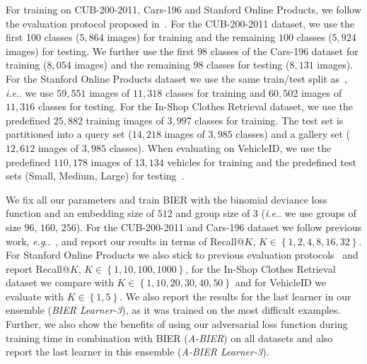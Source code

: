 \documentclass[10pt,journal,compsoc]{IEEEtran}
\makeatletter
\DeclareRobustCommand\onedot{\futurelet\@let@token\@onedot}
\def\@onedot{\ifx\@let@token.\else.\null\fi\xspace}
\def\eg{\emph{e.g}\onedot} \def\Eg{\emph{E.g}\onedot}
\def\ie{\emph{i.e}\onedot} \def\Ie{\emph{I.e}\onedot}
\makeatother
\begin{document}
For training on CUB-200-2011, Cars-196 and Stanford Online Products, we follow the evaluation protocol proposed
in~\cite{oh2016deep}. For the CUB-200-2011 dataset, we use the first 100
classes ($5,864$ images) for training and the remaining $100$ classes ($5,924$
images) for testing.  We further use the first $98$ classes of the Cars-196
dataset for training ($8,054$ images) and  the remaining $98$ classes for
testing ($8,131$ images).  For the Stanford Online Products dataset we use the
same train/test split as~\cite{oh2016deep}, \ie we use $59,551$
images of $11,318$ classes for training and $60,502$ images of $11,316$ classes
for testing.
For the In-Shop Clothes Retrieval dataset, we use the predefined $25,882$ training images of $3,997$ classes for training.
The test set is partitioned into a query set ($14,218$ images of $3,985$ classes) and a gallery set ($12,612$ images of $3,985$ classes).
When evaluating on VehicleID, we use the predefined $110,178$ images of $13,134$ vehicles for training and the predefined
test sets (Small, Medium, Large) for testing~\cite{liu2016deep}.

We fix all our parameters and train \ac{BIER} with the binomial deviance loss
function and an embedding size of $512$ and group size of $3$ (\ie we use
groups of size $96$, $160$, $256$). For the CUB-200-2011 and Cars-196 dataset
we follow previous work, \eg~\cite{oh2016deep}, and report our results in terms
of Recall@$K$, ${K \in \left\{1, 2, 4, 8, 16, 32\right\}}$. For Stanford
Online Products we also stick to previous evaluation
protocols~\cite{oh2016deep} and report Recall@$K$, $K \in \left\{1, 10, 100,
1000 \right\}$, for the In-Shop Clothes Retrieval dataset we compare with $K
\in \left\{1, 10, 20, 30, 40, 50\right\}$ and for VehicleID we evaluate with $K
\in \left\{1, 5\right\}$. We also report the results for the last learner in
our ensemble (\emph{BIER Learner-3}), as it was trained on the most difficult
examples.
Further, we also show the benefits of using our adversarial loss function during training time 
in combination with \ac{BIER} (\emph{A-BIER}) on all datasets and also report the last learner 
in this ensemble (\emph{A-\ac{BIER} Learner-3}). 
\end{document}
